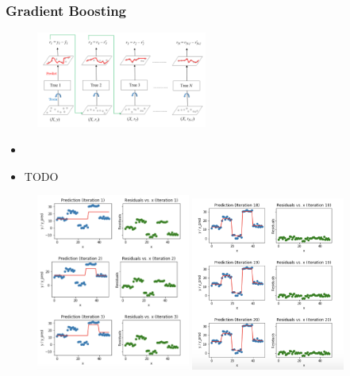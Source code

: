 \documentclass{article}
\begin{document}
\subsubsection{Gradient Boosting}

\begin{figure}[H]
    \centering
    \includegraphics[width=0.5\textwidth]{gradient-boosting.png}
    \caption{}
\end{figure}


\begin{itemize}
    \item 
    \item TODO 
\end{itemize}

\begin{figure}[H]
    \centering
    \includegraphics[width=0.45\textwidth]{gradient-boosting2.png}
    \includegraphics[width=0.45\textwidth]{gradient-boosting3.png}
    \caption{}
\end{figure}
\end{document}
